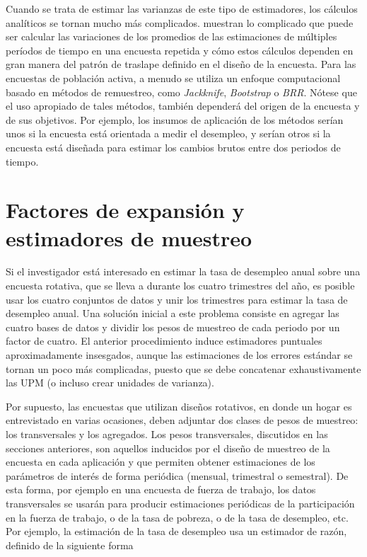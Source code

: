 \documentclass[
  12pt,
  spanish,
]{book}
\begin{document}
Cuando se trata de estimar las varianzas de este tipo de estimadores,
los cálculos analíticos se tornan mucho más complicados.
\citet{Train_Cahoon_Makens_1978} muestran lo complicado que puede ser calcular
las variaciones de los promedios de las estimaciones de múltiples
períodos de tiempo en una encuesta repetida y cómo estos cálculos
dependen en gran manera del patrón de traslape definido en el diseño de
la encuesta. Para las encuestas de población activa, a menudo se utiliza
un enfoque computacional basado en métodos de remuestreo, como
\emph{Jackknife}, \emph{Bootstrap} o \emph{BRR}. Nótese que el uso apropiado de tales
métodos, también dependerá del origen de la encuesta y de sus objetivos.
Por ejemplo, los insumos de aplicación de los métodos serían unos si la
encuesta está orientada a medir el desempleo, y serían otros si la encuesta
está diseñada para estimar los cambios brutos entre dos periodos de
tiempo.

\hypertarget{factores-de-expansiuxf3n-y-estimadores-de-muestreo}{%
\section{Factores de expansión y estimadores de muestreo}\label{factores-de-expansiuxf3n-y-estimadores-de-muestreo}}

Si el investigador está interesado en estimar la tasa de
desempleo anual sobre una encuesta rotativa, que se lleva a durante los cuatro trimestres del año, es posible usar los cuatro conjuntos de datos y unir los trimestres para estimar la tasa de desempleo anual. Una solución
inicial a este problema consiste en agregar las cuatro bases de datos y
dividir los pesos de muestreo de cada periodo por un factor de cuatro.
El anterior procedimiento induce estimadores puntuales aproximadamente
insesgados, aunque las estimaciones de los errores estándar se tornan un
poco más complicadas, puesto que se debe concatenar exhaustivamente las
UPM (o incluso crear unidades de varianza).

Por supuesto, las encuestas que utilizan diseños rotativos, en donde un
hogar es entrevistado en varias ocasiones, deben adjuntar dos clases de
pesos de muestreo: los transversales y los agregados. Los pesos
transversales, discutidos en las secciones anteriores, son aquellos
inducidos por el diseño de muestreo de la encuesta en cada aplicación y
que permiten obtener estimaciones de los parámetros de interés de forma
periódica (mensual, trimestral o semestral). De esta forma, por ejemplo
en una encuesta de fuerza de trabajo, los datos transversales se usarán
para producir estimaciones periódicas de la participación en la fuerza
de trabajo, o de la tasa de pobreza, o de la tasa de desempleo, etc. Por ejemplo, la estimación de la tasa de desempleo usa
un estimador de razón, definido de la siguiente forma
\end{document}
